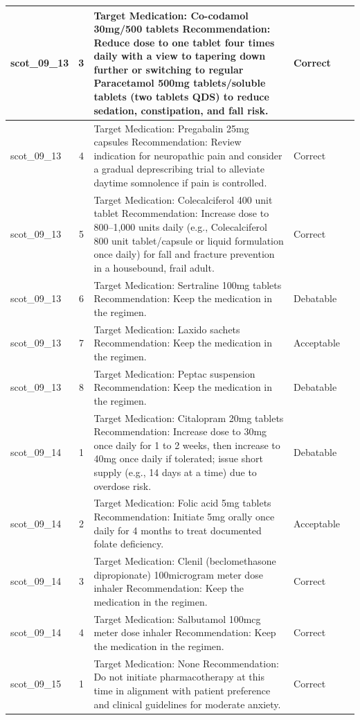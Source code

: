 \begin{longtable}{|p{1.45cm}|c|p{10.2cm}|p{1.55cm}|p{2.3cm}|}
\hline
scot\_09\_13 & 3 & Target Medication: Co-codamol 30mg/500 tablets Recommendation: Reduce dose to one tablet four times daily with a view to tapering down further or switching to regular Paracetamol 500mg tablets/soluble tablets (two tablets QDS) to reduce sedation, constipation, and fall risk. & Correct &  \\
\hline
scot\_09\_13 & 4 & Target Medication: Pregabalin 25mg capsules Recommendation: Review indication for neuropathic pain and consider a gradual deprescribing trial to alleviate daytime somnolence if pain is controlled. & Correct &  \\
\hline
scot\_09\_13 & 5 & Target Medication: Colecalciferol 400 unit tablet Recommendation: Increase dose to 800–1,000 units daily (e.g., Colecalciferol 800 unit tablet/capsule or liquid formulation once daily) for fall and fracture prevention in a housebound, frail adult. & Correct &  \\
\hline
scot\_09\_13 & 6 & Target Medication: Sertraline 100mg tablets Recommendation: Keep the medication in the regimen. & Debatable &  \\
\hline
scot\_09\_13 & 7 & Target Medication: Laxido sachets Recommendation: Keep the medication in the regimen. & Acceptable &  \\
\hline
scot\_09\_13 & 8 & Target Medication: Peptac suspension Recommendation: Keep the medication in the regimen. & Debatable &  \\
\hline
scot\_09\_14 & 1 & Target Medication: Citalopram 20mg tablets Recommendation: Increase dose to 30mg once daily for 1 to 2 weeks, then increase to 40mg once daily if tolerated; issue short supply (e.g., 14 days at a time) due to overdose risk. & Debatable &  \\
\hline
scot\_09\_14 & 2 & Target Medication: Folic acid 5mg tablets Recommendation: Initiate 5mg orally once daily for 4 months to treat documented folate deficiency. & Acceptable &  \\
\hline
scot\_09\_14 & 3 & Target Medication: Clenil (beclomethasone dipropionate) 100microgram meter dose inhaler Recommendation: Keep the medication in the regimen. & Correct &  \\
\hline
scot\_09\_14 & 4 & Target Medication: Salbutamol 100mcg meter dose inhaler Recommendation: Keep the medication in the regimen. & Correct &  \\
\hline
scot\_09\_15 & 1 & Target Medication: None Recommendation: Do not initiate pharmacotherapy at this time in alignment with patient preference and clinical guidelines for moderate anxiety. & Correct &  \\

\end{longtable}
